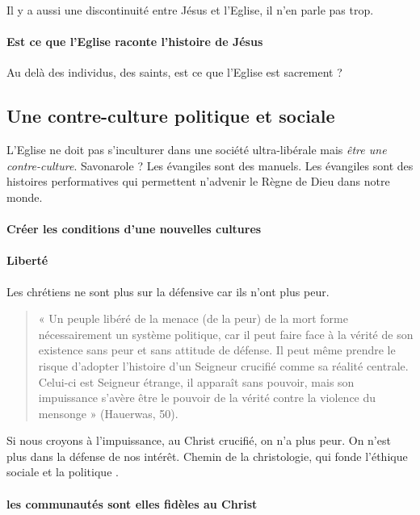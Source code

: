 Il y a aussi une discontinuité entre Jésus et l'Eglise, il n'en parle pas trop.

\paragraph{Est ce que l'Eglise raconte l'histoire de Jésus} Au delà des individus, des saints, est ce que l'Eglise est sacrement ?

\subsection{Une contre-culture politique et sociale} 

L'Eglise ne doit pas s'inculturer dans une société ultra-libérale mais \textit{être une contre-culture}. Savonarole ? Les évangiles sont des manuels. Les évangiles sont des histoires performatives qui permettent n'advenir le Règne de Dieu dans notre monde. 


\paragraph{Créer les conditions d'une nouvelles cultures}


\paragraph{Liberté} Les chrétiens ne sont plus sur la défensive car ils n'ont plus peur.

\begin{quote}
    « Un peuple libéré de la menace (de la peur) de la mort forme nécessairement un système politique,
car il peut faire face à la vérité de son existence sans peur et sans attitude de défense. Il peut même
prendre le risque d’adopter l’histoire d’un Seigneur crucifié comme sa réalité centrale. Celui-ci est
Seigneur étrange, il apparaît sans pouvoir, mais son impuissance s’avère être le pouvoir de la vérité
contre la violence du mensonge » (Hauerwas, 50).
\end{quote}


Si nous croyons à l'impuissance, au Christ crucifié, on n'a plus peur. On n'est plus dans la défense de nos intérêt. Chemin de la christologie, qui fonde l'éthique sociale et la politique .

\paragraph{les communautés sont elles fidèles au Christ}

